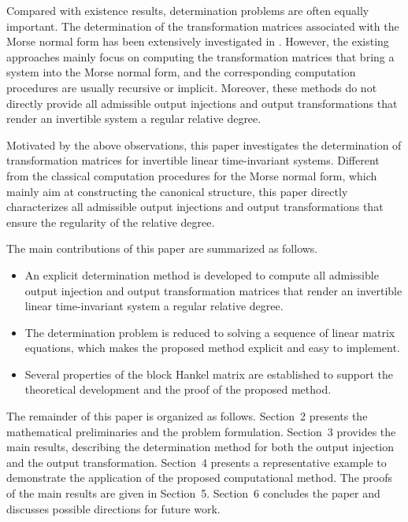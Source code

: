 \documentclass[sort&compress]{elsarticle}
\begin{document}
Compared with existence results,
determination problems are often equally important.
The determination of the transformation matrices associated with the Morse normal form
has been extensively investigated in
\cite{Thorp1973,Jordan1977,vanDooren1979LAA[J],
Kitapci1984CDC[C],Dragan1987,Sannuti1987,Suda1994,Kucera20,Chen21}.
However, the existing approaches mainly focus on computing the transformation matrices
that bring a system into the Morse normal form,
and the corresponding computation procedures are usually recursive or implicit.
Moreover, these methods do not directly provide all admissible output injections
and output transformations that render an invertible system a regular relative degree.

Motivated by the above observations,
this paper investigates the determination of transformation matrices
for invertible linear time-invariant systems.
Different from the classical computation procedures for the Morse normal form,
which mainly aim at constructing the canonical structure,
this paper directly characterizes all admissible output injections
and output transformations that ensure the regularity of the relative degree.

The main contributions of this paper are summarized as follows.
\begin{itemize}

\item An explicit determination method is developed to compute all admissible
output injection and output transformation matrices that render
an invertible linear time-invariant system a regular relative degree.

\item The determination problem is reduced to solving a sequence of
linear matrix equations, which makes the proposed method explicit
and easy to implement.

\item Several properties of the block Hankel matrix are established
to support the theoretical development and the proof of the proposed method.

\end{itemize}

The remainder of this paper is organized as follows.
Section~2 presents the mathematical preliminaries and the problem formulation.
Section~3 provides the main results, describing the determination method
for both the output injection and the output transformation.
Section~4 presents a representative example to demonstrate
the application of the proposed computational method.
The proofs of the main results are given in Section~5.
Section~6 concludes the paper and discusses possible directions for future work.
\end{document}
